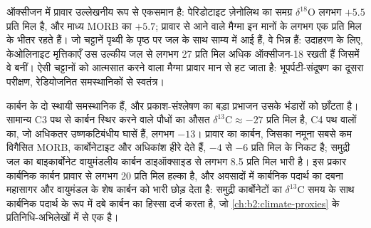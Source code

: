 ऑक्सीजन में प्रावार उल्लेखनीय रूप से एकसमान है: पेरिडोटाइट ज़ेनोलिथ का समग्र
$\delta^{18}\mathrm{O}$ लगभग $+5.5$ प्रति मिल है, और माध्य MORB का $+5.7$; प्रावार से आने वाले
मैग्मा इन मानों के लगभग एक प्रति मिल के भीतर रहते हैं। जो चट्टानें पृथ्वी के पृष्ठ पर
जल के साथ साम्य में आई हैं, वे भिन्न हैं: उदाहरण के लिए, केओलिनाइट मृत्तिकाएँ
उस उल्कीय जल से लगभग 27 प्रति मिल अधिक ऑक्सीजन-18 रखती हैं जिसमें वे
बनीं। ऐसी चट्टानों को आत्मसात करने वाला मैग्मा प्रावार मान से
हट जाता है: भूपर्पटी-संदूषण का दूसरा परीक्षण, रेडियोजनित
समस्थानिकों से स्वतंत्र।

कार्बन के दो स्थायी समस्थानिक हैं, और प्रकाश-संश्लेषण का बड़ा प्रभाजन
उसके भंडारों को छाँटता है। सामान्य C3 पथ से कार्बन स्थिर करने वाले पौधों का औसत
$\delta^{13}\mathrm{C} \approx -27$ प्रति मिल है, C4 पथ वालों का, जो अधिकतर उष्णकटिबंधीय
घासें हैं, लगभग $-13$। प्रावार का कार्बन, जिसका नमूना सबसे कम विगैसित
MORB, कार्बोनेटाइट और अधिकांश हीरे देते हैं, $-4$ से $-6$ प्रति मिल के निकट है;
समुद्री जल का बाइकार्बोनेट वायुमंडलीय कार्बन
डाइऑक्साइड से लगभग 8.5 प्रति मिल भारी है। इस प्रकार कार्बनिक कार्बन प्रावार से लगभग 20 प्रति मिल हल्का है, और
अवसादों में कार्बनिक पदार्थ का दबना महासागर और वायुमंडल के शेष कार्बन को
भारी छोड़ देता है: समुद्री कार्बोनेटों का $\delta^{13}\mathrm{C}$
समय के साथ कार्बनिक पदार्थ के रूप में दबे कार्बन का हिस्सा दर्ज करता है, जो
\cref{ch:b2:climate-proxies} के प्रतिनिधि-अभिलेखों में से एक है।

\begin{omfigure}
\centering
{}
\par{}
\end{omfigure}

